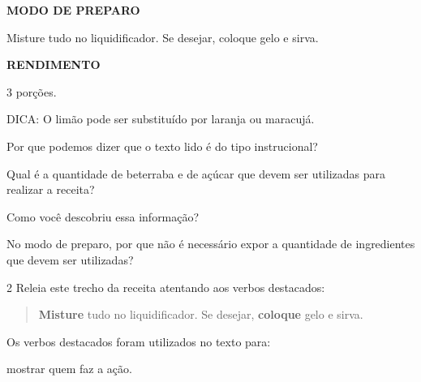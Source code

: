 \begin{escolha}
\textbf{MODO DE PREPARO}

Misture tudo no liquidificador. Se desejar, coloque gelo e sirva.

\textbf{RENDIMENTO}

3 porções.

DICA: O limão pode ser substituído por laranja ou maracujá.


\item Por que podemos dizer que o texto lido é do tipo instrucional?


\item Qual é a quantidade de beterraba e de açúcar que devem ser utilizadas
para realizar a receita?


\item Como você descobriu essa informação?


\item No modo de preparo, por que não é necessário expor a quantidade de
ingredientes que devem ser utilizadas?


\num{2} Releia este trecho da receita atentando aos verbos destacados:

\begin{quote}
\textbf{Misture} tudo no liquidificador. Se desejar, \textbf{coloque} gelo e sirva.
\end{quote}

\begin{escolha}
\item
  Os verbos destacados foram utilizados no texto para:

\begin{boxlist}
\boxitem[] mostrar quem faz a ação.


\end{boxlist}
\end{escolha}
\end{escolha}

